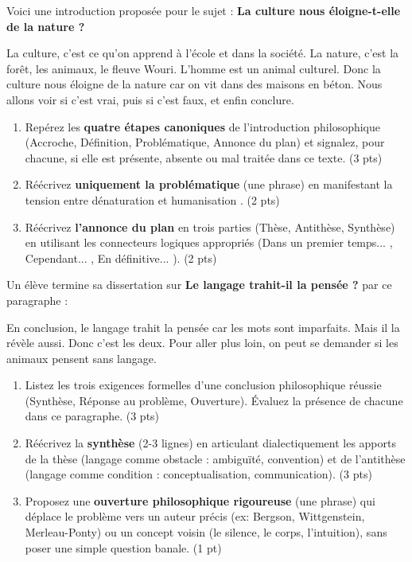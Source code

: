 \documentclass[11pt]{article}
\begin{document}
\begin{exercice}
Voici une introduction proposée pour le sujet : \og \textbf{La culture nous éloigne-t-elle de la nature ?} \fg{}

\og La culture, c'est ce qu'on apprend à l'école et dans la société. La nature, c'est la forêt, les animaux, le fleuve Wouri. L'homme est un animal culturel. Donc la culture nous éloigne de la nature car on vit dans des maisons en béton. Nous allons voir si c'est vrai, puis si c'est faux, et enfin conclure. \fg{}

\begin{enumerate}
    \item Repérez les \textbf{quatre étapes canoniques} de l'introduction philosophique (Accroche, Définition, Problématique, Annonce du plan) et signalez, pour chacune, si elle est présente, absente ou mal traitée dans ce texte. (3 pts)
    \item Réécrivez \textbf{uniquement la problématique} (une phrase) en manifestant la tension entre \og dénaturation \fg{} et \og humanisation \fg{}. (2 pts)
    \item Réécrivez \textbf{l'annonce du plan} en trois parties (Thèse, Antithèse, Synthèse) en utilisant les connecteurs logiques appropriés (\og Dans un premier temps... \fg{}, \og Cependant... \fg{}, \og En définitive... \fg{}). (2 pts)
\end{enumerate}
\end{exercice}

\begin{exercice}
Un élève termine sa dissertation sur \og \textbf{Le langage trahit-il la pensée ?} \fg{} par ce paragraphe :

\og En conclusion, le langage trahit la pensée car les mots sont imparfaits. Mais il la révèle aussi. Donc c'est les deux. Pour aller plus loin, on peut se demander si les animaux pensent sans langage. \fg{}

\begin{enumerate}
    \item Listez les trois exigences formelles d'une conclusion philosophique réussie (Synthèse, Réponse au problème, Ouverture). Évaluez la présence de chacune dans ce paragraphe. (3 pts)
    \item Réécrivez la \textbf{synthèse} (2-3 lignes) en articulant dialectiquement les apports de la thèse (langage comme obstacle : ambiguïté, convention) et de l'antithèse (langage comme condition : conceptualisation, communication). (3 pts)
    \item Proposez une \textbf{ouverture philosophique rigoureuse} (une phrase) qui déplace le problème vers un auteur précis (ex: Bergson, Wittgenstein, Merleau-Ponty) ou un concept voisin (le silence, le corps, l'intuition), sans poser une simple question banale. (1 pt)
\end{enumerate}
\end{exercice}
\end{document}

